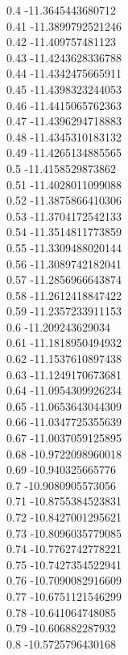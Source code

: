 {0.4	-11.3645443680712\\
0.41	-11.3899792521246\\
0.42	-11.409757481123\\
0.43	-11.4243628336788\\
0.44	-11.4342475665911\\
0.45	-11.4398323244053\\
0.46	-11.4415065762363\\
0.47	-11.4396294718883\\
0.48	-11.4345310183132\\
0.49	-11.4265134885565\\
0.5	-11.4158529873862\\
0.51	-11.4028011099088\\
0.52	-11.3875866410306\\
0.53	-11.3704172542133\\
0.54	-11.3514811773859\\
0.55	-11.3309488020144\\
0.56	-11.3089742182041\\
0.57	-11.2856966643874\\
0.58	-11.2612418847422\\
0.59	-11.2357233911153\\
0.6	-11.209243629034\\
0.61	-11.1818950494932\\
0.62	-11.1537610897438\\
0.63	-11.1249170673681\\
0.64	-11.0954309926234\\
0.65	-11.0653643044309\\
0.66	-11.0347725355639\\
0.67	-11.0037059125895\\
0.68	-10.9722098960018\\
0.69	-10.940325665776\\
0.7	-10.9080905573056\\
0.71	-10.8755384523831\\
0.72	-10.8427001295621\\
0.73	-10.8096035779085\\
0.74	-10.7762742778221\\
0.75	-10.7427354522941\\
0.76	-10.7090082916609\\
0.77	-10.6751121546299\\
0.78	-10.641064748085\\
0.79	-10.606882287932\\
0.8	-10.5725796430168\\
}
